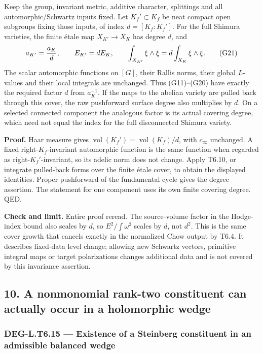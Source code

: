 Keep the group, invariant metric, additive character, splittings and all automorphic/Schwartz inputs fixed. Let \(K_f'\subset K_f\) be neat compact open subgroups fixing those inputs, of index \(d=[K_f:K_f']\). For the full Shimura varieties, the finite étale map \(X_{K'}\to X_K\) has degree \(d\), and \[
a_{K'}={a_K\over d},\qquad
E_{K'}=dE_K,\qquad
\int_{X_{K'}}\xi\wedge\bar\xi
=d\int_{X_K}\xi\wedge\bar\xi.
\tag{G21}
\] The scalar automorphic functions on \([G]\), their Rallis norms, their global \(L\)-values and their local integrals are unchanged. Thus (G11)--(G20) have exactly the required factor \(d\) from \(a_K^{-1}\). If the maps to the abelian variety are pulled back through this cover, the raw pushforward surface degree also multiplies by \(d\). On a selected connected component the analogous factor is its actual covering degree, which need not equal the index for the full disconnected Shimura variety.

\textbf{Proof.} Haar measure gives \(\operatorname{vol}(K_f')=\operatorname{vol}(K_f)/d\), with \(c_\infty\) unchanged. A fixed right-\(K_f\)-invariant automorphic function is the same function when regarded as right-\(K_f'\)-invariant, so its adelic norm does not change. Apply T6.10, or integrate pulled-back forms over the finite étale cover, to obtain the displayed identities. Proper pushforward of the fundamental cycle gives the degree assertion. The statement for one component uses its own finite covering degree. QED.

\textbf{Check and limit.} Entire proof reread. The source-volume factor in the Hodge-index bound also scales by \(d\), so \(E^2/\int\omega^2\) scales by \(d\), not \(d^2\). This is the same cover growth that cancels exactly in the normalized Chow output by T6.4. It describes fixed-data level change; allowing new Schwartz vectors, primitive integral maps or target polarizations changes additional data and is not covered by this invariance assertion.

\subsection{10. A nonmonomial rank-two constituent can actually occur in a holomorphic wedge}\label{a-nonmonomial-rank-two-constituent-can-actually-occur-in-a-holomorphic-wedge}

\subsubsection{DEG-L.T6.15 --- Existence of a Steinberg constituent in an admissible balanced wedge}\label{DEG-L.T6.15}

